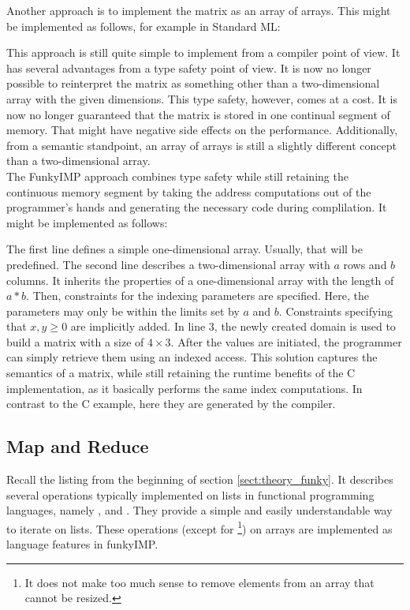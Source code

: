 Another approach is to implement the matrix as an array of arrays. This might be implemented as follows, for example in Standard ML:



This approach is still quite simple to implement from a compiler point of view. It has several advantages from a type safety point of view. It is now no longer possible to reinterpret the matrix as something other than a two-dimensional array with the given dimensions. This type safety, however, comes at a cost. It is now no longer guaranteed that the matrix is stored in one continual segment of memory. That might have negative side effects on the performance. Additionally, from a semantic standpoint, an array of arrays is still a slightly different concept than a two-dimensional array. \\

The FunkyIMP approach combines type safety while still retaining the continuous memory segment by taking the address computations out of the programmer's hands and generating the necessary code during complilation. It might be implemented as follows:



The first line defines a simple one-dimensional array. Usually, that will be predefined. The second line describes a two-dimensional array with $a$ rows and $b$ columns. It inherits the properties of a one-dimensional array with the length of $a*b$. Then, constraints for the indexing parameters are specified. Here, the parameters may only be within the limits set by $a$ and $b$. Constraints specifying that $x,y \geq 0$ are implicitly added. In line 3, the newly created domain is used to build a matrix with a size of $4\times3$. After the values are initiated, the programmer can simply retrieve them using an indexed access. %
 This solution captures the semantics of a matrix, while still retaining the runtime benefits of the C implementation, as it basically performs the same index computations. In contrast to the C example, here they are generated by the compiler.

\subsection{Map and Reduce}
\label{sect:theory_funky_mapreduce}
Recall the listing from the beginning of section \ref{sect:theory_funky}. It describes several operations typically implemented on lists in functional programming languages, namely ,  and . They provide a simple and easily understandable way to iterate on lists. These operations (except for \footnote{It does not make too much sense to remove elements from an array that cannot be resized.}) on arrays are implemented as language features in funkyIMP.\\

